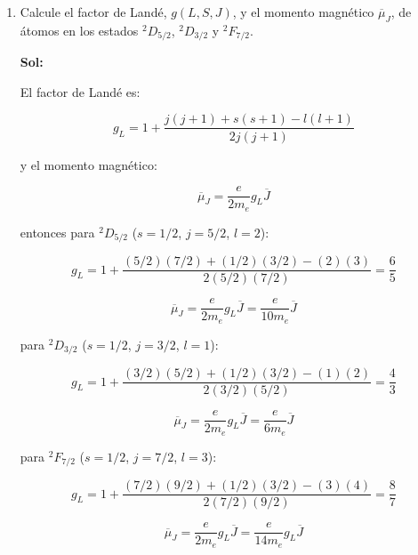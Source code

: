 \documentclass[12pt,a4paper]{article}
\begin{document}
\begin{enumerate}




\item Calcule el factor de Landé, $g(L,S,J)$, y el momento magnético $\overline{\mu}_{J}$, de átomos en los estados $^{2}D_{5/2}$, $^{2}D_{3/2}$ y $^{2}F_{7/2}$.


\textbf{Sol:}

El factor de Landé es:

\begin{equation*}
    g_L = 1 + \frac{j(j+1)+s(s+1) - l(l+1)}{2j(j+1)}
\end{equation*}

y el momento magnético:

\begin{equation*}
    \overline{\mu}_{J} = \frac{e}{2 m_e} g_L \overline{J}
\end{equation*}

entonces para $^2D_{5/2}$ ($s=1/2$, $j=5/2$, $l =2$):

\begin{equation*}
    g_L =1+ \frac{(5/2)(7/2)+ (1/2)(3/2)- (2)(3)}{2(5/2)(7/2)} = \frac{6}{5}
\end{equation*}

\begin{equation*}
    \overline{\mu}_{J} = \frac{e}{2 m_e} g_L \overline{J} = \frac{e}{10 m_e} \overline{J} 
\end{equation*}

para $^2D_{3/2}$ ($s=1/2$, $j=3/2$, $l=1$):

\begin{equation*}
    g_L =1+ \frac{(3/2)(5/2)+(1/2)(3/2) - (1)(2)}{2(3/2)(5/2)} = \frac{4}{3}
\end{equation*}

\begin{equation*}
    \overline{\mu}_{J} = \frac{e}{2 m_e} g_L \overline{J} =\frac{e}{6 m_e} \overline{J}
\end{equation*}


para $^2F_{7/2}$ ($s=1/2$, $j=7/2$, $l=3$):

\begin{equation*}
    g_L =1+ \frac{(7/2)(9/2)+(1/2)(3/2)-(3)(4)}{2(7/2)(9/2)} = \frac{8}{7}
\end{equation*}

\begin{equation*}
    \overline{\mu}_{J} = \frac{e}{2 m_e} g_L \overline{J} =\frac{e}{14 m_e} g_L \overline{J}
\end{equation*}



\end{enumerate}
\end{document}

